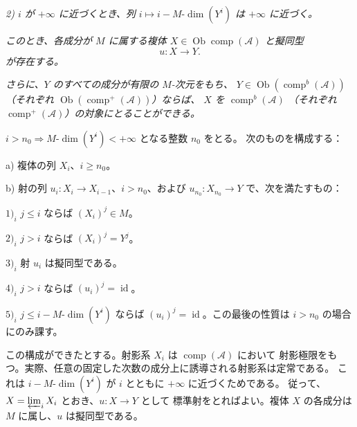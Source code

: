 \clearpage
{}%
\begingroup\small\setlength{\parskip}{0pt}\setlength{\emergencystretch}{1.5em}
\setlength{\abovedisplayskip}{4pt plus 2pt minus 2pt}%
\setlength{\belowdisplayskip}{4pt plus 2pt minus 2pt}%

\noindent\textit{2) $i$ が $+\infty$ に近づくとき、列
$i\longmapsto i-M\text{-}\dim(Y^i)$ は $+\infty$ に近づく。}

\textit{このとき、各成分が $M$ に属する複体
$X\in\operatorname{Ob}\operatorname{comp}(\mathcal A)$ と擬同型}
\[
u\colon X\longrightarrow Y.
\]
\textit{が存在する。}

\textit{さらに、$Y$ のすべての成分が有限の $M$-次元をもち、
$Y\in\operatorname{Ob}(\operatorname{comp}^{b}(\mathcal A))$
（それぞれ $\operatorname{Ob}(\operatorname{comp}^{+}(\mathcal A))$）ならば、
$X$ を $\operatorname{comp}^{b}(\mathcal A)$
（それぞれ $\operatorname{comp}^{+}(\mathcal A)$）の対象にとることができる。}

$i>n_0\Rightarrow M\text{-}\dim(Y^i)<+\infty$ となる整数 $n_0$ をとる。
次のものを構成する：

\noindent a) 複体の列 $X_i$、$i\geq n_0$。

\noindent b) 射の列
$u_i\colon X_i\longrightarrow X_{i-1}$、$i>n_0$、および
$u_{n_0}\colon X_{n_0}\longrightarrow Y$ で、次を満たすもの：

\noindent $1)_i$ $j\leq i$ ならば $(X_i)^j\in M$。

\noindent $2)_i$ $j>i$ ならば $(X_i)^j=Y^j$。

\noindent $3)_i$ 射 $u_i$ は擬同型である。

\noindent $4)_i$ $j>i$ ならば $(u_i)^j=\operatorname{id}$。

\noindent $5)_i$ $j\leq i-M\text{-}\dim(Y^i)$ ならば
$(u_i)^j=\operatorname{id}$。この最後の性質は $i>n_0$ の場合にのみ課す。

この構成ができたとする。射影系 $X_i$ は $\operatorname{comp}(\mathcal A)$ において
射影極限をもつ。実際、任意の固定した次数の成分上に誘導される射影系は定常である。
これは $i-M\text{-}\dim(Y^i)$ が $i$ とともに $+\infty$ に近づくためである。
従って、$X=\varprojlim_i X_i$ とおき、$u\colon X\longrightarrow Y$ として
標準射をとればよい。複体 $X$ の各成分は $M$ に属し、$u$ は擬同型である。

